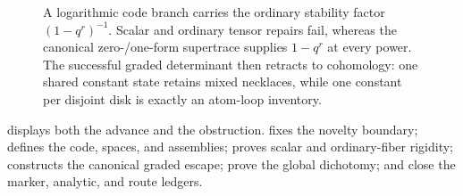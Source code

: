 \begin{figure}[t]
  \centering
  \resizebox{\textwidth}{!}{}
  \caption{A logarithmic code branch carries the ordinary stability factor
  \((1-q^r)^{-1}\).  Scalar and ordinary tensor repairs fail, whereas the
  canonical zero-/one-form supertrace supplies \(1-q^r\) at every power.
  The successful graded determinant then retracts to cohomology: one shared
  constant state retains mixed necklaces, while one constant per disjoint
  disk is exactly an atom-loop inventory.}
  \label{fig:collapse}
\end{figure}

 displays both the advance and the obstruction.
 fixes the novelty boundary;
 defines the code, spaces, and assemblies;
 proves scalar and ordinary-fiber rigidity;
 constructs the canonical graded escape;
 prove the global dichotomy; and
 close the marker, analytic, and route ledgers.

